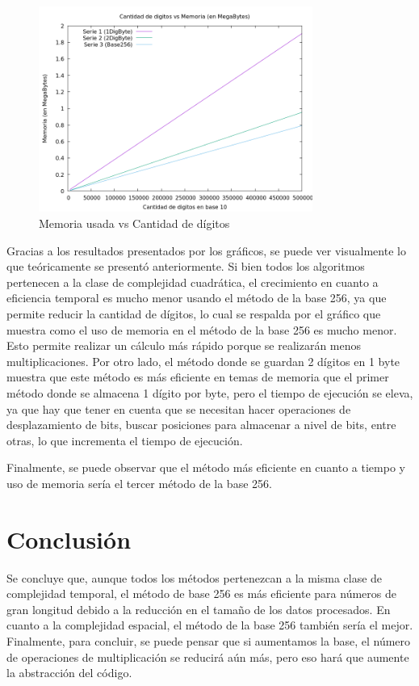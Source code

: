 \documentclass[10pt]{article}
\begin{document}
\begin{figure}[H]
    \centering
    \includegraphics[width=0.8\textwidth]{MemoriaMegabytes.png}
    \caption{Memoria usada vs Cantidad de dígitos}
    \label{fig:me1}
\end{figure}

Gracias a los resultados presentados por los gráficos, se puede ver visualmente lo que teóricamente se presentó anteriormente. Si bien todos los algoritmos pertenecen a la clase de complejidad cuadrática, el crecimiento en cuanto a eficiencia temporal es mucho menor usando el método de la base 256, ya que permite reducir la cantidad de dígitos, lo cual se respalda por el gráfico que muestra como el uso de memoria en el método de la base 256 es mucho menor. Esto permite realizar un cálculo más rápido porque se realizarán menos multiplicaciones. Por otro lado, el método donde se guardan 2 dígitos en 1 byte muestra que este método es más eficiente en temas de memoria que el primer método donde se almacena 1 dígito por byte, pero el tiempo de ejecución se eleva, ya que hay que tener en cuenta que se necesitan hacer operaciones de desplazamiento de bits, buscar posiciones para almacenar a nivel de bits, entre otras, lo que incrementa el tiempo de ejecución. 

Finalmente, se puede observar que el método más eficiente en cuanto a tiempo y uso de memoria sería el tercer método de la base 256.

\section{Conclusión}

Se concluye que, aunque todos los métodos pertenezcan a la misma clase de complejidad temporal, el método de base 256 es más eficiente para números de gran longitud debido a la reducción en el tamaño de los datos procesados. En cuanto a la complejidad espacial, el método de la base 256 también sería el mejor. Finalmente, para concluir, se puede pensar que si aumentamos la base, el número de operaciones de multiplicación se reducirá aún más, pero eso hará que aumente la abstracción del código.
\end{document}
